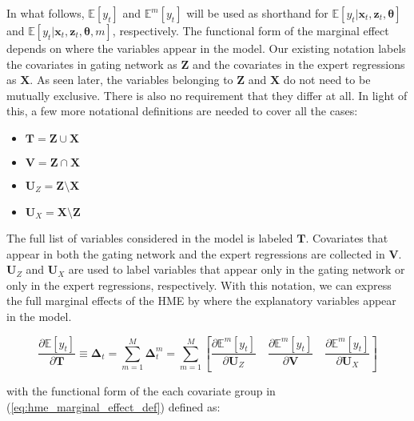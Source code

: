 \documentclass[12pt]{article}
\newcommand{\Eym}{\mathbb{E}^{m} \left[ y_{t} \right]}
\theoremstyle{definition}
\begin{document}
In what follows, $\mathbb{E} \left[y_{t}\right]$ and $\Eym$ will be used as shorthand
for $\mathbb{E} \left[ y_{t} | \boldsymbol{x}_{t}, \boldsymbol{z}_{t}, \boldsymbol{\theta} \right]$
and $\mathbb{E} \left[ y_{t} | \boldsymbol{x}_{t}, \boldsymbol{z}_{t}, \boldsymbol{\theta}, m \right]$,
respectively. The functional form of the marginal effect depends on where the variables
appear in the model. Our existing notation labels the covariates in gating
network as $\boldsymbol{Z}$ and the covariates in the expert regressions 
as $\boldsymbol{X}$. As seen later, the variables belonging to
$\boldsymbol{Z}$ and $\boldsymbol{X}$ do not need to be mutually
exclusive. There is also no requirement that they differ at all.
In light of this, a few more notational definitions are needed to cover
all the cases:

\begin{itemize}  
  \item $\boldsymbol{T} = \boldsymbol{Z} \cup \boldsymbol{X}$
  \item $\boldsymbol{V} = \boldsymbol{Z} \cap \boldsymbol{X}$
  \item $\boldsymbol{U}_{Z} = \boldsymbol{Z} \setminus \boldsymbol{X}$
  \item $\boldsymbol{U}_{X} = \boldsymbol{X} \setminus \boldsymbol{Z}$
\end{itemize}


The full list of variables considered in the model is labeled $\boldsymbol{T}$.
Covariates that appear in both the gating network and the expert regressions
are collected in $\boldsymbol{V}$. $\boldsymbol{U}_{Z}$ and $\boldsymbol{U}_{X}$ are
used to label variables that appear only in the gating network or only in the expert
regressions, respectively. With this notation, we can express the full marginal effects
of the HME by where the explanatory variables appear in the model.

\begin{equation} \label{eq:hme_marginal_effect_def}
  \frac{\partial \mathbb{E} \left[y_{t}\right]}{\partial \boldsymbol{T}} \equiv \boldsymbol{\Delta}_{t} = \sum_{m=1}^{M} \boldsymbol{\Delta}^{m}_{t} = \sum_{m=1}^{M} \left[ \frac{\partial \Eym}{\partial \boldsymbol{U}_{Z}}   \quad   \frac{\partial \Eym}{\partial \boldsymbol{V}}   \quad   \frac{\partial \Eym}{\partial \boldsymbol{U}_{X}}   \right]
\end{equation}

with the functional form of the each covariate group in (\ref{eq:hme_marginal_effect_def})
defined as:
\end{document}

